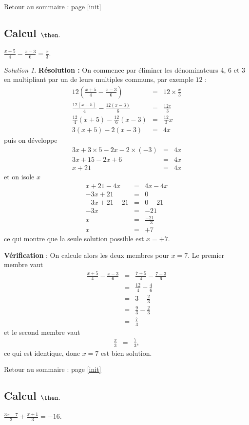 \documentclass[14pt]{article}
\theoremstyle{remark}
\newtheorem*{sol}{Solution}
\newcounter{n}
\renewcommand{\it}{Retour au sommaire : page \ref{init}
	\subsection{Calcul $ \mathbf{ \then}.$}\label{\then} \stepcounter{n} }
\theoremstyle{plain}
\begin{document}
\it $\frac{x+5}4 - \frac{x-3}6 = \frac{x}3$. 
\begin{sol}
\textbf{Résolution :} On commence par éliminer les dénominateurs $4$, $6$ et $3$ en multipliant par un de leurs multiples communs, par exemple $12$ : 
\begin{eqnarray*} 12\left(\frac{x+5}4 - \frac{x-3}6 \right) &=& 12\times \frac{x}3\\
\frac{12(x+5)}4 - \frac{12(x-3)}6 &=& \frac{12x}3\\
\frac{12}4(x+5) - \frac{12}6(x-3) &=& \frac{12}3 x \\
3(x+5) - 2(x-3) &=& 4x \end{eqnarray*}
puis on développe 
\begin{eqnarray*}
3x+3\times 5 -2x -2\times (-3) &=& 4x\\
3x+15-2x+6 &=& 4x \\
x+21 &=& 4x
\end{eqnarray*}et on isole $x$
\begin{eqnarray*}
x+21-4x &= &4x-4x\\
-3x+21 &=& 0 \\
-3x+21-21 &=& 0-21\\
-3x &=& -21 \\
x&=& \frac{-21}{-3}\\
x&=& +7\end{eqnarray*}
ce qui montre que la seule solution possible est $x=+7$. 

\textbf{Vérification} : On calcule alors les deux membres pour $x=7$. Le premier membre vaut 
\begin{eqnarray*} \frac{x+5}4 - \frac{x-3}6
&=& \frac{7+5}4 -\frac{7-3}6 \\
&=& \frac{12}4 - \frac46 \\
&=& 3 - \frac{2}{3} \\
&=& \frac93-\frac{2}{3}\\
&=& \frac73\end{eqnarray*}
et le second membre vaut 
\begin{eqnarray*}\frac{x}3&=& \frac73,
\end{eqnarray*} ce qui est identique, donc $x=7$ est bien solution.
\end{sol}
\it $\frac{3x-7}2 + \frac{x+1}3 = -16$. 
\end{document}
